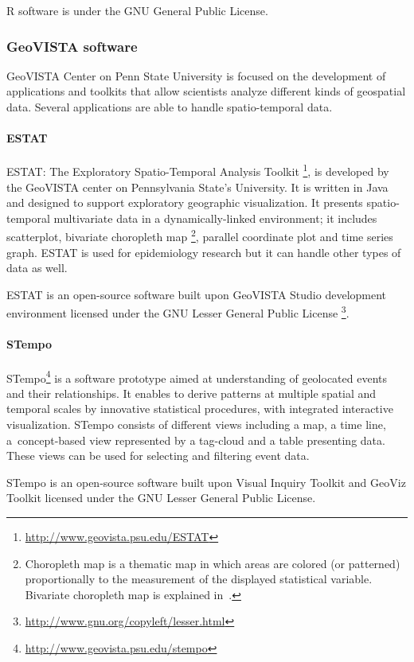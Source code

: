 \documentclass[a4paper,12pt,oneside]{book}
\begin{document}
R software is under the GNU General Public License.

\subsubsection{GeoVISTA software}
GeoVISTA Center on Penn State University is focused on the development of applications
and toolkits that allow scientists analyze different kinds of geospatial data.
Several applications are able to handle spatio-temporal data.

\paragraph{ESTAT}
ESTAT: The Exploratory Spatio-Temporal Analysis Toolkit%
\footnote{\url{http://www.geovista.psu.edu/ESTAT}},
is developed by the GeoVISTA
center on Pennsylvania State's University. It is written in Java and designed to support exploratory
geographic visualization. It presents spatio-temporal multivariate data
in a dynamically-linked environment; it includes scatterplot, bivariate choropleth map%
\footnote{Choropleth map is a thematic map in which areas are colored
(or patterned) proportionally to the measurement of the displayed statistical variable.
Bivariate choropleth map is explained in~\cite{leonowicz2006two}.},
parallel coordinate plot and time series graph.
ESTAT is used for epidemiology research but it can handle other types of data as well.

ESTAT is an open-source software built upon GeoVISTA Studio development environment
licensed under the GNU Lesser General Public License%
\footnote{\url{http://www.gnu.org/copyleft/lesser.html}}.

\paragraph{STempo}
STempo\footnote{\url{http://www.geovista.psu.edu/stempo}} is a software prototype aimed at
understanding of geolocated events and their relationships.
It enables to derive patterns at multiple spatial and temporal scales by innovative statistical procedures,
with integrated interactive visualization.
STempo consists of different views including a map, a time line,
a~concept-based view represented by a tag-cloud and a table presenting data.
These views can be used for selecting and filtering event data.

STempo is an open-source software built upon Visual Inquiry Toolkit and GeoViz Toolkit
licensed under the GNU Lesser General Public License.
\end{document}
